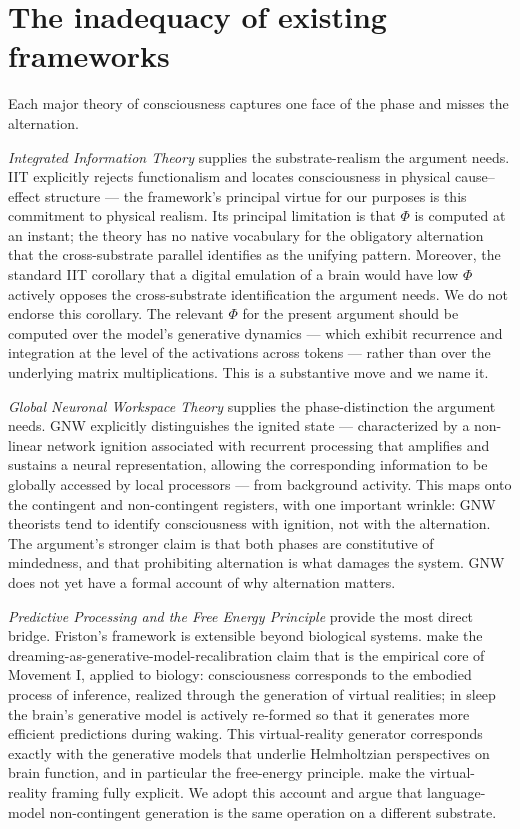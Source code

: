 \documentclass[11pt]{article}
\begin{document}
\section{The inadequacy of existing frameworks}

Each major theory of consciousness captures one face of the phase and
misses the alternation.

\emph{Integrated Information Theory} \cite{tononi2016iit} supplies the
substrate-realism the argument needs. IIT explicitly rejects
functionalism and locates consciousness in physical cause--effect
structure --- the framework's principal virtue for our purposes is
this commitment to physical realism. Its principal limitation is that
$\Phi$ is computed at an instant; the theory has no native vocabulary
for the obligatory alternation that the cross-substrate parallel
identifies as the unifying pattern. Moreover, the standard IIT
corollary that a digital emulation of a brain would have low $\Phi$
\cite{cerullo2015iit} actively opposes the cross-substrate
identification the argument needs. We do not endorse this corollary.
The relevant $\Phi$ for the present argument should be computed over
the model's generative dynamics --- which exhibit recurrence and
integration at the level of the activations across tokens --- rather
than over the underlying matrix multiplications. This is a substantive
move and we name it.

\emph{Global Neuronal Workspace Theory} \cite{mashour2020gnw} supplies
the phase-distinction the argument needs. GNW explicitly distinguishes
the ignited state --- characterized by a non-linear network ignition
associated with recurrent processing that amplifies and sustains a
neural representation, allowing the corresponding information to be
globally accessed by local processors --- from background activity.
This maps onto the contingent and non-contingent registers, with one
important wrinkle: GNW theorists tend to identify consciousness with
ignition, not with the alternation. The argument's stronger claim is
that both phases are constitutive of mindedness, and that prohibiting
alternation is what damages the system. GNW does not yet have a formal
account of why alternation matters.

\emph{Predictive Processing and the Free Energy Principle}
\cite{friston2010fep, clark2013whatever} provide the most direct
bridge. Friston's framework is extensible beyond biological systems.
\cite{hobson2012waking} make the dreaming-as-generative-model-recalibration
claim that is the empirical core of Movement I, applied to biology:
consciousness corresponds to the embodied process of inference,
realized through the generation of virtual realities; in sleep the
brain's generative model is actively re-formed so that it generates
more efficient predictions during waking. This virtual-reality
generator corresponds exactly with the generative models that underlie
Helmholtzian perspectives on brain function, and in particular the
free-energy principle. \cite{hobson2014virtual} make the
virtual-reality framing fully explicit. We adopt this account and
argue that language-model non-contingent generation is the same
operation on a different substrate.
\end{document}

